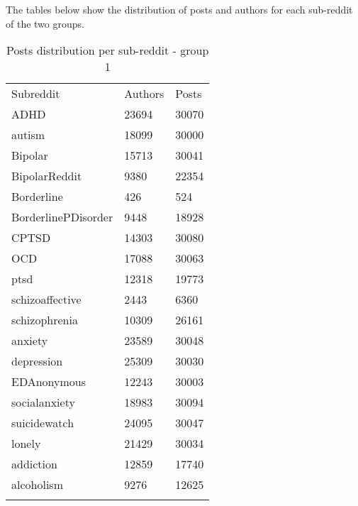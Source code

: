 \documentclass{article}
\begin{document}
The tables below show the distribution of posts and authors for each sub-reddit of the two groups.

\begin{minipage}{0.49\linewidth}
\begin{table}[H]
	\label{tab:stat1}
	\centering  
	\begin{tabular}{lll}
		\hline\noalign{\smallskip}
		Subreddit 				& Authors	& Posts  \\
		\noalign{\smallskip}\hline\noalign{\smallskip}
		ADHD					&	23694	&	30070	\\
		autism					&	18099	&	30000	\\
		Bipolar					&	15713	&	30041	\\
		BipolarReddit			&	9380	&	22354	\\
		Borderline				&	426		&	524	\\
		BorderlinePDisorder		&	9448	&	18928	\\
		CPTSD					&	14303	&	30080	\\
		OCD						&	17088	&	30063	\\
		ptsd					&	12318	&	19773	\\
		schizoaffective			&	2443	&	6360	\\
		schizophrenia			&	10309	&	26161	\\
		anxiety					&	23589	&	30048	\\
		depression				&	25309	&	30030	\\
		EDAnonymous				&	12243	&	30003	\\
		socialanxiety			&	18983	&	30094	\\
		suicidewatch			&	24095	&	30047	\\
		lonely					&	21429	&	30034	\\
		addiction				&	12859	&	17740	\\
		alcoholism				&	9276	&	12625	\\
		\noalign{\smallskip}\hline
	\end{tabular}
	\caption {Posts distribution per sub-reddit - group 1}
\end{table}
\end{minipage}
\hfill
\end{document}
